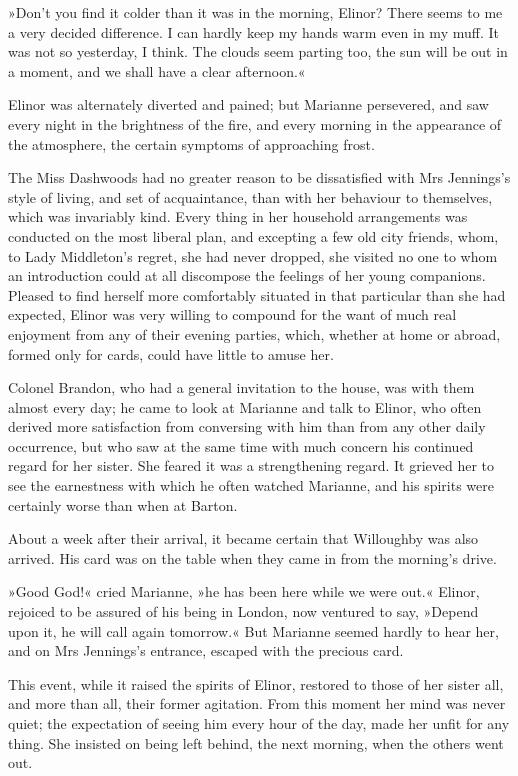 »Don’t you find it colder than it was in the morning, Elinor? There seems to me a very decided difference. I can hardly keep my hands warm even in my muff. It was not so yesterday, I think. The clouds seem parting too, the sun will be out in a moment, and we shall have a clear afternoon.«

Elinor was alternately diverted and pained; but Marianne persevered, and saw every night in the brightness of the fire, and every morning in the appearance of the atmosphere, the certain symptoms of approaching frost.

The Miss Dashwoods had no greater reason to be dissatisfied with Mrs Jennings’s style of living, and set of acquaintance, than with her behaviour to themselves, which was invariably kind. Every thing in her household arrangements was conducted on the most liberal plan, and excepting a few old city friends, whom, to Lady Middleton’s regret, she had never dropped, she visited no one to whom an introduction could at all discompose the feelings of her young companions. Pleased to find herself more comfortably situated in that particular than she had expected, Elinor was very willing to compound for the want of much real enjoyment from any of their evening parties, which, whether at home or abroad, formed only for cards, could have little to amuse her.

Colonel Brandon, who had a general invitation to the house, was with them almost every day; he came to look at Marianne and talk to Elinor, who often derived more satisfaction from conversing with him than from any other daily occurrence, but who saw at the same time with much concern his continued regard for her sister. She feared it was a strengthening regard. It grieved her to see the earnestness with which he often watched Marianne, and his spirits were certainly worse than when at Barton.

About a week after their arrival, it became certain that Willoughby was also arrived. His card was on the table when they came in from the morning’s drive.

»Good God!« cried Marianne, »he has been here while we were out.« Elinor, rejoiced to be assured of his being in London, now ventured to say, »Depend upon it, he will call again tomorrow.« But Marianne seemed hardly to hear her, and on Mrs Jennings’s entrance, escaped with the precious card.

This event, while it raised the spirits of Elinor, restored to those of her sister all, and more than all, their former agitation. From this moment her mind was never quiet; the expectation of seeing him every hour of the day, made her unfit for any thing. She insisted on being left behind, the next morning, when the others went out.

